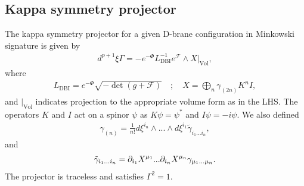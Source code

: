 \subsection{Kappa symmetry projector}
The kappa symmetry projector for a given D-brane configuration in Minkowski signature is given by \cite{Skenderis:2002vf}
\begin{align}
d^{p+1} \xi \Gamma = - e^{-\Phi} L_{\text{DBI}}^{-1} e^{\mathcal{F}}\wedge X|_{\text{Vol}},
\end{align}
where
\begin{align}
L_{\text{DBI}}= e^{-\Phi} \sqrt{-\det  (g+\mathcal{F})}\quad;
\quad
X = \bigoplus_n \gamma_{(2n)} K^n I,
\end{align}
and $|_{\text{Vol}}$ indicates projection to the appropriate volume form as in the LHS.
The operators $K$ and $I$ act on a spinor $\psi$ as $K \psi = \psi^*$ and $I \psi = -i \psi$.
We also defined
\begin{align}
\gamma_{(n)} = \frac{1}{n !}d\xi^{i_n}\wedge ... \wedge d\xi^{i_1} \tilde{\gamma}_{i_1...i_n},
\end{align}
and
\begin{align}
\tilde{\gamma}_{i_1...i_n} = \partial_{i_1} X^{\mu_1}...\partial_{i_n} X^{\mu_n}\gamma_{\mu_1...\mu_n}.
\end{align}
The projector is traceless and satisfies $\Gamma^2 = 1$.

